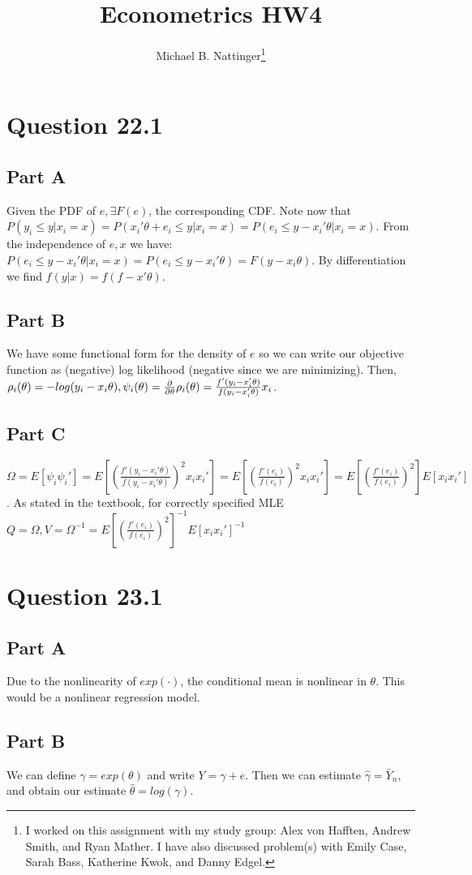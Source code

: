 \documentclass[11pt]{article} %
\title{Econometrics HW4}
\author{Michael B. Nattinger\footnote{I worked on this assignment with my study group: Alex von Hafften, Andrew Smith, and Ryan Mather. I have also discussed problem(s) with Emily Case, Sarah Bass, Katherine Kwok, and Danny Edgel.}}
\begin{document}
\maketitle

\section{Question 22.1}
\subsection{Part A}
Given the PDF of $e, \exists F(e)$, the corresponding CDF. Note now that $P(y_i \leq y | x_i = x) = P(x_i'\theta + e_i \leq y|x_i = x) = P(e_i\leq y-x_i'\theta|x_i = x).$ From the independence of $e,x$ we have: $P(e_i \leq y-x_i'\theta|x_i=x) = P(e_i \leq y-x_i'\theta) = F(y-x_i\theta).$ By differentiation we find $f(y|x) = f(f-x'\theta)$.
\subsection{Part B}
We have some functional form for the density of $e$ so we can write our objective function as (negative) log likelihood (negative since we are minimizing).  Then, $\rho_i(\theta) = - log(y_i - x_i\theta), \\ \psi_i(\theta) = \frac{\partial}{\partial \theta}\rho_i(\theta)  = \frac{f'(y_i - x_i'\theta)}{f(y_i - x_i'\theta)}x_i$.
\subsection{Part C}
$\Omega = E[\psi_i \psi_i'] = E[\left(\frac{f'(y_i - x_i'\theta)}{f(y_i - x_i'\theta)}\right)^2x_ix_i'] = E[\left(\frac{f'(e_i)}{f(e_i)}\right)^2x_ix_i'] = E[\left(\frac{f'(e_i)}{f(e_i)}\right)^2]E[x_ix_i']$. As stated in the textbook, for correctly specified MLE $Q=\Omega, V = \Omega^{-1} = E[\left(\frac{f'(e_i)}{f(e_i)}\right)^2]^{-1}E[x_ix_i']^{-1}$
\section{Question 23.1}
\subsection{Part A}
Due to the nonlinearity of $exp(\cdot )$, the conditional mean is nonlinear in $\theta$. This would be a nonlinear regression model.
\subsection{Part B}
We can define $\gamma = exp(\theta)$ and write $Y=\gamma + e$. Then we can estimate $\hat{\gamma} = \bar{Y}_n$, and obtain our estimate $\hat{\theta} = log(\gamma).$
\end{document}

